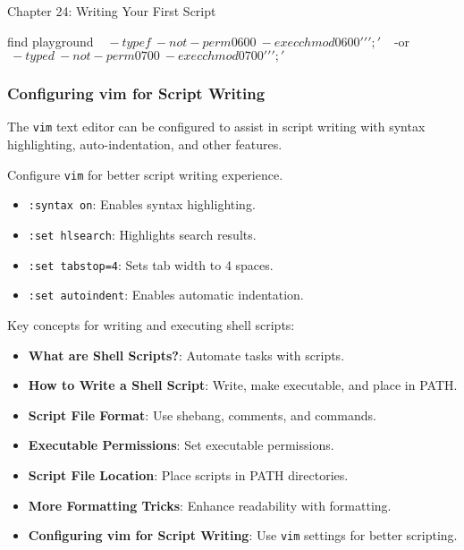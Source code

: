 \begin{notes}{Chapter 24: Writing Your First Script}
\begin{highlight}
    \begin{code}[Shell]
    find playground \
        \( \
        -type f \
        -not -perm 0600 \
        -exec chmod 0600 '{}' ';' \
        \) \
        -or \
        \( \
        -type d \
        -not -perm 0700 \
        -exec chmod 0700 '{}' ';' \
        \)
    \end{code}
    
    \end{highlight}
    
    \subsubsection*{Configuring vim for Script Writing}
    
    The \texttt{vim} text editor can be configured to assist in script writing with syntax highlighting, auto-indentation, and other features.
    
    \begin{highlight}
    
    Configure \texttt{vim} for better script writing experience.
    
    \begin{itemize}
        \item \texttt{:syntax on}: Enables syntax highlighting.
        \item \texttt{:set hlsearch}: Highlights search results.
        \item \texttt{:set tabstop=4}: Sets tab width to 4 spaces.
        \item \texttt{:set autoindent}: Enables automatic indentation.
    \end{itemize}
    
    \end{highlight}
    
    \begin{highlight}[Summary of Key Concepts]
    
    Key concepts for writing and executing shell scripts:
    
    \begin{itemize}
        \item \textbf{What are Shell Scripts?}: Automate tasks with scripts.
        \item \textbf{How to Write a Shell Script}: Write, make executable, and place in PATH.
        \item \textbf{Script File Format}: Use shebang, comments, and commands.
        \item \textbf{Executable Permissions}: Set executable permissions.
        \item \textbf{Script File Location}: Place scripts in PATH directories.
        \item \textbf{More Formatting Tricks}: Enhance readability with formatting.
        \item \textbf{Configuring vim for Script Writing}: Use \texttt{vim} settings for better scripting.
    \end{itemize}
    

\end{highlight}
\end{notes}
